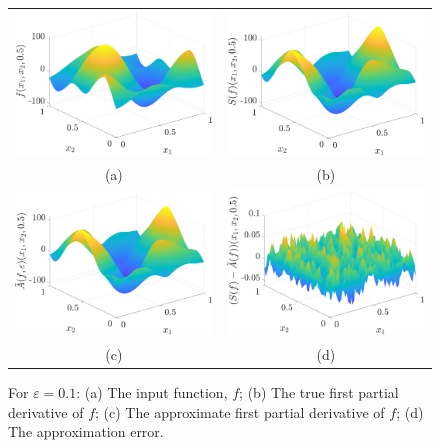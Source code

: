\documentclass[graybox,footinfo]{svmult}
\begin{document}
\begin{figure}[ht]
	\centering
	\begin{tabular}{cc}
		\includegraphics[width =5.5 cm]{ProgramsImages/SimFourCoefInpFun.eps} &
		\includegraphics[width = 5.5 cm]{ProgramsImages/SimFourCoefSol.eps}
		\\ (a) & (b) \\
		\includegraphics[width =5.5 cm]{ProgramsImages/SimDirectSolAppx.eps} &
		\includegraphics[width = 5.5 cm]{ProgramsImages/SimDirectSolErr.eps}
		\\ (c) & (d)
	\end{tabular}
	\caption{For $\varepsilon = 0.1$:  (a) The input function, $f$; (b) The true first partial derivative of $f$; (c) The approximate first partial derivative of $f$; 
		(d) The approximation error.
		\label{solfig}} %
\end{figure}
\end{document}
